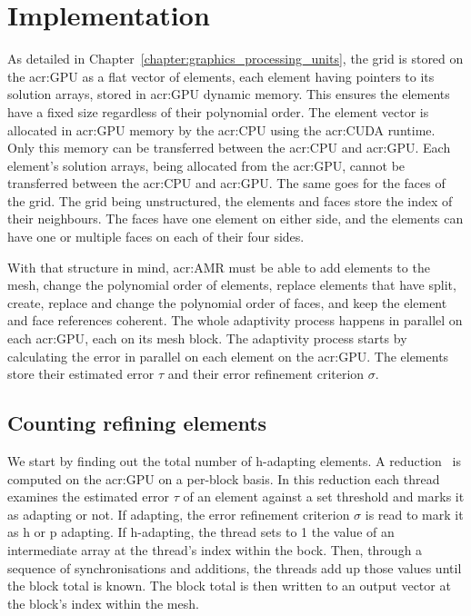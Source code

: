 \section{Implementation}\label{section:adaptive_mesh_refinement:implementation}

As detailed in Chapter~\ref{chapter:graphics_processing_units}, the grid is stored on the
\acrshort{acr:GPU} as a flat vector of elements, each element having pointers to its solution
arrays, stored in \acrshort{acr:GPU} dynamic memory. This ensures the elements have a fixed size
regardless of their polynomial order. The element vector is allocated in \acrshort{acr:GPU} memory
by the \acrshort{acr:CPU} using the \acrshort{acr:CUDA} runtime. Only this memory can be transferred
between the \acrshort{acr:CPU} and \acrshort{acr:GPU}. Each element's solution arrays, being
allocated from the \acrshort{acr:GPU}, cannot be transferred between the \acrshort{acr:CPU} and
\acrshort{acr:GPU}. The same goes for the faces of the grid. The grid being unstructured, the
elements and faces store the index of their neighbours. The faces have one element on either side,
and the elements can have one or multiple faces on each of their four sides.

With that structure in mind, \acrlong{acr:AMR} must be able to add elements to the mesh, change the
polynomial order of elements, replace elements that have split, create, replace and change the
polynomial order of faces, and keep the element and face references coherent. The whole adaptivity
process happens in parallel on each \acrshort{acr:GPU}, each on its mesh block. The adaptivity
process starts by calculating the error in parallel on each element on the \acrshort{acr:GPU}. The
elements store their estimated error \(\tau \) and their error refinement criterion \(\sigma \).

\subsection{Counting refining elements}\label{subsection:adaptive_mesh_refinement:implementation:counting_refining_elements}


We start by finding out the total number of h-adapting elements. A reduction~\cite{Harris2007} is
computed on the \acrshort{acr:GPU} on a per-block basis. In this reduction each thread examines the
estimated error \(\tau \) of an element against a set threshold and marks it as adapting or not. If
adapting, the error refinement criterion \(\sigma \) is read to mark it as h or p adapting. If
h-adapting, the thread sets to 1 the value of an intermediate array at the thread's index within the
bock. Then, through a sequence of synchronisations and additions, the threads add up those values
until the block total is known. The block total is then written to an output vector at the block's
index within the mesh.

